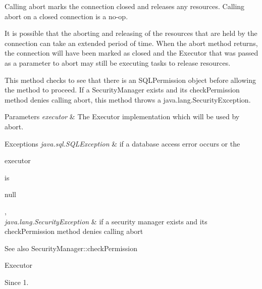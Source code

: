 Calling {\ttfamily abort} marks the connection closed and releases any resources. Calling {\ttfamily abort} on a closed connection is a no-\/op. 

It is possible that the aborting and releasing of the resources that are held by the connection can take an extended period of time. When the {\ttfamily abort} method returns, the connection will have been marked as closed and the {\ttfamily Executor} that was passed as a parameter to abort may still be executing tasks to release resources. 

This method checks to see that there is an {\ttfamily S\+Q\+L\+Permission} object before allowing the method to proceed. If a {\ttfamily Security\+Manager} exists and its {\ttfamily check\+Permission} method denies calling {\ttfamily abort}, this method throws a {\ttfamily java.\+lang.\+Security\+Exception}.


\begin{DoxyParams}{Parameters}
{\em executor} & The {\ttfamily Executor} implementation which will be used by {\ttfamily abort}. \\
\hline
\end{DoxyParams}

\begin{DoxyExceptions}{Exceptions}
{\em java.\+sql.\+S\+Q\+L\+Exception} & if a database access error occurs or the
\begin{DoxyCode}
executor 
\end{DoxyCode}
 is
\begin{DoxyCode}
null 
\end{DoxyCode}
 , \\
\hline
{\em java.\+lang.\+Security\+Exception} & if a security manager exists and its {\ttfamily check\+Permission} method denies calling {\ttfamily abort} \\
\hline
\end{DoxyExceptions}
\begin{DoxySeeAlso}{See also}
Security\+Manager\+::check\+Permission 

Executor 
\end{DoxySeeAlso}
\begin{DoxySince}{Since}
1. 
\end{DoxySince}
\mbox{\label{classcom_1_1mysql_1_1cj_1_1jdbc_1_1_connection_impl_a39a1f63273b1ccd8e4baf30f1f6955a9}} 
